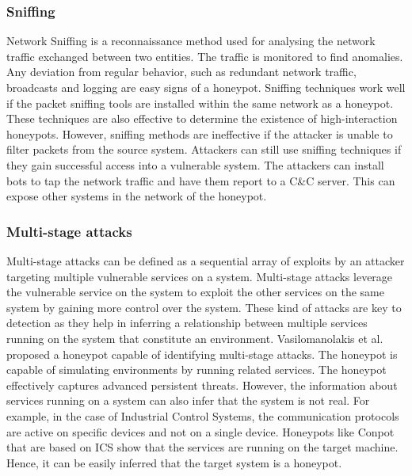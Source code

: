 \documentclass[../main.tex]{subfiles}
\begin{document}
\subsubsection{Sniffing}
Network Sniffing is a reconnaissance method used for analysing the network traffic exchanged between two entities. The traffic is monitored to find anomalies. Any deviation from regular behavior, such as redundant network traffic, broadcasts and logging are easy signs of a honeypot. Sniffing techniques work well if the packet sniffing tools are installed within the same network as a honeypot. These techniques are also effective to determine the existence of high-interaction honeypots. However, sniffing methods are ineffective if the attacker is unable to filter packets from the source system. Attackers can still use sniffing techniques if they gain successful access into a vulnerable system. The attackers can install bots to tap the network traffic and have them report to a C\&C server. This can expose other systems in the network of the honeypot. 
\newline
\subsubsection{Multi-stage attacks}
Multi-stage attacks can be defined as a sequential array of exploits by an attacker targeting multiple vulnerable services on a system. Multi-stage attacks leverage the vulnerable service on the system to exploit the other services on the same system by gaining more control over the system. These kind of attacks are key to detection as they help in inferring a relationship between multiple services running on the system that constitute an environment. Vasilomanolakis et al. \cite{vasilomanolakis} proposed a honeypot capable of identifying multi-stage attacks. The honeypot is capable of simulating environments by running related services. The honeypot effectively captures advanced persistent threats. However, the information about services running on a system can also infer that the system is not real. For example, in the case of Industrial Control Systems, the communication protocols are active on specific devices and not on a single device. Honeypots like Conpot that are based on ICS show that the services are running on the target machine. Hence, it can be easily inferred that the target system is a honeypot. 
\newline
\end{document}
